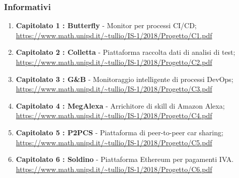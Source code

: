 			\subsubsection{Informativi}
				\begin{enumerate}
					\item \textbf{Capitolato 1 : Butterfly} - Monitor per processi CI/CD;
						\newline
						\url{ https://www.math.unipd.it/~tullio/IS-1/2018/Progetto/C1.pdf}
					\item \textbf{Capitolato 2 : Colletta} - Piattaforma raccolta dati di analisi di test;
						\newline
						\url{https://www.math.unipd.it/~tullio/IS-1/2018/Progetto/C2.pdf}
					\item \textbf{Capitolato 3 : G\&B} - Monitoraggio intelligente di processi DevOps\pedice;
						\newline
						\url{https://www.math.unipd.it/~tullio/IS-1/2018/Progetto/C3.pdf}
					\item \textbf{Capitolato 4 : MegAlexa} - Arrichitore di skill di Amazon Alexa;
						\newline
						\url{https://www.math.unipd.it/~tullio/IS-1/2018/Progetto/C4.pdf}
					\item \textbf{Capitolato 5 : P2PCS} - Piattaforma di peer-to-peer car sharing; 
						\newline 
						\url{https://www.math.unipd.it/~tullio/IS-1/2018/Progetto/C5.pdf}
					\item \textbf{Capitolato 6 : Soldino} - Piattaforma Ethereum per pagamenti IVA.
						\newline 
						\url{https://www.math.unipd.it/~tullio/IS-1/2018/Progetto/C6.pdf}
            \end{enumerate}
